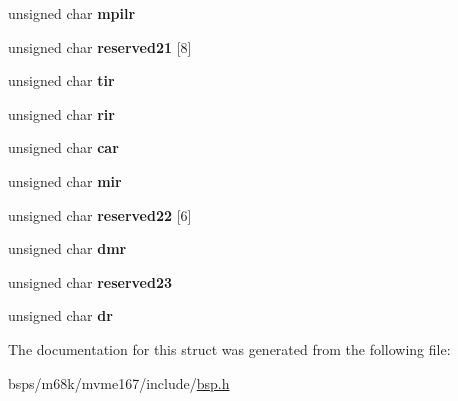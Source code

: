 \begin{DoxyCompactItemize}
unsigned char {\bfseries mpilr}
\item 
\mbox{\label{structcd2401__regs___aa57a8897acbf68962b1322cb864c56aa}} 
unsigned char {\bfseries reserved21} \mbox{[}8\mbox{]}
\item 
\mbox{\label{structcd2401__regs___acd214910211007cbebf1dd0a41d7e40c}} 
unsigned char {\bfseries tir}
\item 
\mbox{\label{structcd2401__regs___a58f22f1a77a387dd2e30688ed82e7a30}} 
unsigned char {\bfseries rir}
\item 
\mbox{\label{structcd2401__regs___ab12cd69c785042039536402919fd2a5c}} 
unsigned char {\bfseries car}
\item 
\mbox{\label{structcd2401__regs___ac2237247bd67f93379f8a2aa19651d73}} 
unsigned char {\bfseries mir}
\item 
\mbox{\label{structcd2401__regs___acbd7b6d538f7cf9c27dbf42376690803}} 
unsigned char {\bfseries reserved22} \mbox{[}6\mbox{]}
\item 
\mbox{\label{structcd2401__regs___aef4e8239b296204cf614315aed721688}} 
unsigned char {\bfseries dmr}
\item 
\mbox{\label{structcd2401__regs___a448323c9e12690744083c62a7f04b9c5}} 
unsigned char {\bfseries reserved23}
\item 
\mbox{\label{structcd2401__regs___a22f6fa808f388585eb619b020ddda3d7}} 
unsigned char {\bfseries dr}
\end{DoxyCompactItemize}


The documentation for this struct was generated from the following file\+:\begin{DoxyCompactItemize}
\item 
bsps/m68k/mvme167/include/\mbox{\hyperlink{bsps_2m68k_2mvme167_2include_2bsp_8h}{bsp.\+h}}\end{DoxyCompactItemize}
